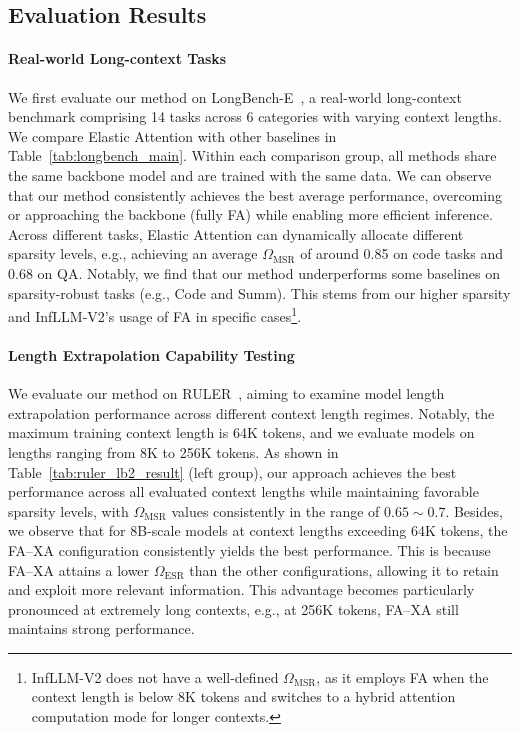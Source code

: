 \subsection{Evaluation Results}
\label{subsec:eval_res_main}
\paragraph{Real-world Long-context Tasks}
We first evaluate our method on LongBench-E~\citep{bai2024longbench}, a real-world long-context benchmark comprising 14 tasks across 6 categories with varying context lengths. 
We compare Elastic Attention with other baselines in Table~\ref{tab:longbench_main}.
Within each comparison group, all methods share the same backbone model and are trained with the same data.
We can observe that our method consistently achieves the best average performance, overcoming or approaching the backbone (fully FA) while enabling more efficient inference.
Across different tasks, Elastic Attention can dynamically allocate different sparsity levels, e.g., achieving an average $\Omega_{\mathrm{MSR}}$ of around 0.85 on code tasks and 0.68 on QA.
Notably, we find that our method underperforms some baselines on sparsity-robust tasks (e.g., Code and Summ). 
This stems from our higher sparsity and InfLLM-V2's usage of FA in specific cases\footnote{InfLLM-V2 does not have a well-defined $\Omega_{\mathrm{MSR}}$, as it employs FA when the context length is below 8K tokens and switches to a hybrid attention computation mode for longer contexts.}.

\paragraph{Length Extrapolation Capability Testing}
We evaluate our method on RULER~\citep{hsieh2024ruler}, aiming to examine model length extrapolation performance across different context length regimes.
Notably, the maximum training context length is 64K tokens, and we evaluate models on lengths ranging from 8K to 256K tokens. 
As shown in Table~\ref{tab:ruler_lb2_result} (left group), our approach achieves the best performance across all evaluated context lengths while maintaining favorable sparsity levels, with $\Omega_{\mathrm{MSR}}$ values consistently in the range of $0.65\sim 0.7$.
Besides, we observe that for 8B-scale models at context lengths exceeding 64K tokens, the FA–XA configuration consistently yields the best performance.
This is because FA–XA attains a lower $\Omega_{\mathrm{ESR}}$ than the other configurations, allowing it to retain and exploit more relevant information.
This advantage becomes particularly pronounced at extremely long contexts, e.g., at 256K tokens, FA–XA still maintains strong performance.


